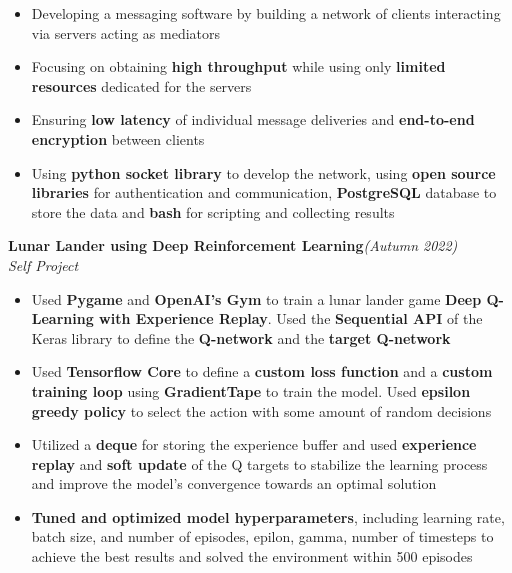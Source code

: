 \documentclass[a4paper,10pt]{article}
\begin{document}
\begin{itemize}[itemsep = -0.65 mm, leftmargin=*]
    \item Developing a messaging software by building a network of clients interacting via servers acting as mediators
    \item Focusing on obtaining \textbf{high throughput} while using only \textbf{limited resources} dedicated for the servers
    \item Ensuring \textbf{low latency} of individual message deliveries and \textbf{end-to-end encryption} between clients
    \item Using \textbf{python socket library} to develop the network, using \textbf{open source libraries} for authentication and communication, \textbf{PostgreSQL} database to store the data and \textbf{bash} for scripting and collecting results
\end{itemize}
\vspace{\baselineskip}
\vspace{-15pt}
\noindent\textbf{\large Lunar Lander using Deep Reinforcement Learning}\hfill{\sl \small (Autumn 2022)}\\
{\it Self Project}
\\\vspace{-15pt}
\begin{itemize}[itemsep = -0.65 mm, leftmargin=*]
    \item Used \textbf{Pygame} and \textbf{OpenAI's Gym} to train a lunar lander game \textbf{Deep Q-Learning with Experience Replay}. Used the \textbf{Sequential API} of the Keras library to define the \textbf{Q-network} and the \textbf{target Q-network}
    \item Used \textbf{Tensorflow Core} to define a \textbf{custom loss function} and a \textbf{custom training loop} using \textbf{GradientTape} to train the model. Used \textbf{epsilon greedy policy} to select the action with some amount of random decisions
    \item Utilized a \textbf{deque} for storing the experience buffer and used \textbf{experience replay} and \textbf{soft update} of the Q targets to stabilize the learning process and improve the model's convergence towards an optimal solution
    \item \textbf{Tuned and optimized model hyperparameters}, including learning rate, batch size, and number of episodes, epilon, gamma, number of timesteps to achieve the best results and solved the environment within 500 episodes
\end{itemize}
\end{document}
